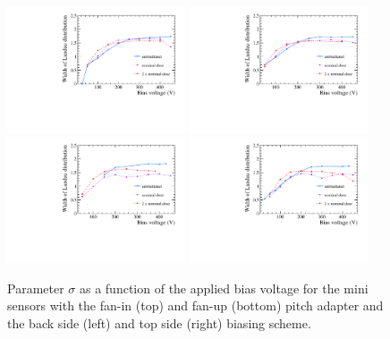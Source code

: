 \begin{figure}[]
\centering
\includegraphics[width=0.47\textwidth]{figs/CombineSNRvsBias/cwidthvsBias_FanIn_Back.pdf}
\includegraphics[width=0.47\textwidth]{figs/CombineSNRvsBias/cwidthvsBias_FanIn_Top.pdf}
\includegraphics[width=0.47\textwidth]{figs/CombineSNRvsBias/cwidthvsBias_FanUp_Back.pdf}
\includegraphics[width=0.47\textwidth]{figs/CombineSNRvsBias/cwidthvsBias_FanUp_Top.pdf}
\caption[Parameter $\sigma$ as a function of the applied bias voltage for the mini sensors.]{Parameter $\sigma$  as a function of the applied bias voltage for the mini sensors with the fan-in (top) and fan-up (bottom) pitch adapter and the back side (left) and top side (right) biasing scheme.}
\label{fig:DepletionVoltage2M}
\end{figure}

